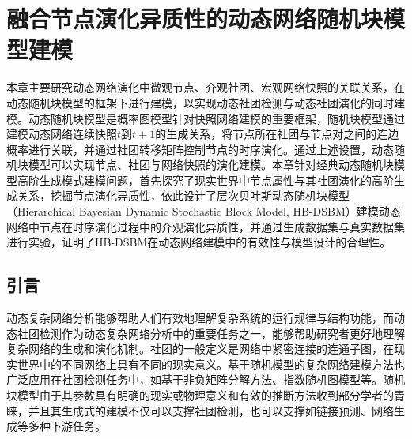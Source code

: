 \baselineskip 20pt

\chapter{融合节点演化异质性的动态网络随机块模型建模} 
\label{chap:3}
本章主要研究动态网络演化中微观节点、介观社团、宏观网络快照的关联关系，在动态随机块模型的框架下进行建模，以实现动态社团检测与动态社团演化的同时建模。动态随机块模型是概率图模型针对快照网络建模的重要框架，随机块模型通过建模动态网络连续快照$t$到$t+1$的生成关系，将节点所在社团与节点对之间的连边概率进行关联，并通过社团转移矩阵控制节点的时序演化。通过上述设置，动态随机块模型可以实现节点、社团与网络快照的演化建模。本章针对经典动态随机块模型高阶生成模式建模问题，首先探究了现实世界中节点属性与其社团演化的高阶生成关系，挖掘节点演化异质性，依此设计了层次贝叶斯动态随机块模型（Hierarchical Bayesian Dynamic Stochastic Block Model, HB-DSBM）建模动态网络中节点在时序演化过程中的介观演化异质性，并通过生成数据集与真实数据集进行实验，证明了HB-DSBM在动态网络建模中的有效性与模型设计的合理性。
\section{引言}
动态复杂网络分析能够帮助人们有效地理解复杂系统的运行规律与结构功能\cite{papadopoulos2012popularity}，而动态社团检测作为动态复杂网络分析中的重要任务之一，能够帮助研究者更好地理解复杂网络的生成和演化机制\cite{martinet2020robust}。社团的一般定义是网络中紧密连接的连通子图，在现实世界中的不同网络上具有不同的现实意义\cite{jin2021survey}。基于随机模型的复杂网络建模方法也广泛应用在社团检测任务中，如基于非负矩阵分解方法、指数随机图模型等。随机块模型由于其参数具有明确的现实或物理意义和有效的推断方法收到部分学者的青睐，并且其生成式的建模不仅可以支撑社团检测，也可以支撑如链接预测\cite{kumar2024community}、网络生成\cite{dreveton2024exact}等多种下游任务。

